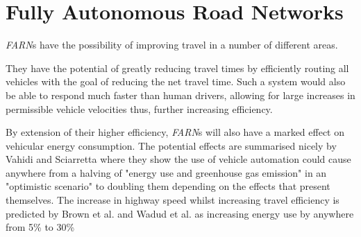 \section{Fully Autonomous Road Networks}

\textit{FARN}s have the possibility of improving travel in a number of different areas. 

They have the potential of greatly reducing travel times by efficiently routing all vehicles with the goal of reducing the net travel time. Such a system would also be able to respond much faster than human drivers, allowing for large increases in permissible vehicle velocities thus, further increasing efficiency.

By extension of their higher efficiency, \textit{FARN}s will also have a marked effect on vehicular energy consumption. The potential effects are summarised nicely by Vahidi and Sciarretta\cite{vahidiEnergySavingPotentials2018} where they show the use of vehicle automation could cause anywhere from a halving of "energy use and greenhouse gas emission" in an "optimistic scenario" to doubling them depending on the effects that present themselves. The increase in highway speed whilst increasing travel efficiency is predicted by Brown et al.\cite{brownAnalysisPossibleEnergy2014} and Wadud et al.\cite{wadudHelpHindranceTravel2016} as increasing energy use by anywhere from 5\% to 30\%


